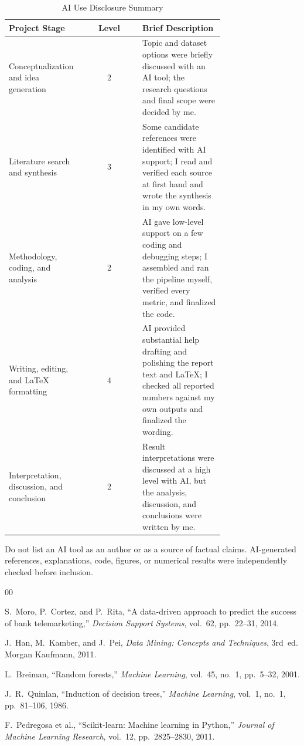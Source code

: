 \documentclass[conference]{IEEEtran}
\begin{document}
	\begin{table}[htbp]
		\caption{AI Use Disclosure Summary}
		\label{tab:ai_use}
		\centering
		\footnotesize
		\begin{tabular}{|p{0.35\linewidth}|c|p{0.38\linewidth}|}
			\hline
			\textbf{Project Stage} & \textbf{Level} & \textbf{Brief Description} \\
			\hline
			Conceptualization and idea generation & 2 & Topic and dataset options were briefly discussed with an AI tool; the research questions and final scope were decided by me. \\
			\hline
			Literature search and synthesis & 3 & Some candidate references were identified with AI support; I read and verified each source at first hand and wrote the synthesis in my own words. \\
			\hline
			Methodology, coding, and analysis & 2 & AI gave low-level support on a few coding and debugging steps; I assembled and ran the pipeline myself, verified every metric, and finalized the code. \\
			\hline
			Writing, editing, and LaTeX formatting & 4 & AI provided substantial help drafting and polishing the report text and LaTeX; I checked all reported numbers against my own outputs and finalized the wording. \\
			\hline
			Interpretation, discussion, and conclusion & 2 & Result interpretations were discussed at a high level with AI, but the analysis, discussion, and conclusions were written by me. \\
			\hline
		\end{tabular}
	\end{table}

	Do not list an AI tool as an author or as a source of factual claims.
	AI-generated references, explanations, code, figures, or numerical results were
	independently checked before inclusion.

	\begin{thebibliography}{00}

		 S.~Moro, P.~Cortez, and P.~Rita, ``A data-driven approach to
		predict the success of bank telemarketing,'' \textit{Decision Support
		Systems}, vol.~62, pp.~22--31, 2014.

		 J.~Han, M.~Kamber, and J.~Pei, \textit{Data Mining: Concepts
		and Techniques}, 3rd~ed. Morgan Kaufmann, 2011.

		 L.~Breiman, ``Random forests,'' \textit{Machine
		Learning}, vol.~45, no.~1, pp.~5--32, 2001.

		 J.~R.~Quinlan, ``Induction of decision trees,''
		\textit{Machine Learning}, vol.~1, no.~1, pp.~81--106, 1986.

		 F.~Pedregosa et al., ``Scikit-learn: Machine learning in
		Python,'' \textit{Journal of Machine Learning Research}, vol.~12,
		pp.~2825--2830, 2011.

	\end{thebibliography}
\end{document}
